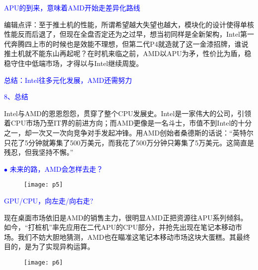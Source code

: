 \documentclass[utf8]{book}
\begin{document}
	
	\begin{flushleft}
		{\large \textcolor{blue}{APU的到来，意味着AMD开始走差异化路线\\}}
	\end{flushleft}

	编辑点评：至于推土机的性能，所谓希望越大失望也越大，模块化的设计使得单核性能反而后退了，但现在全盘否定还为之过早，想当初同样是全新架构，Intel第一代奔腾四上市的时候也是效能不理想，但第二代P4就造就了这一金漆招牌，谁说推土机就不能东山再起呢？在时机来临之前，AMD以APU为矛，性价比为盾，稳稳守住中低端市场，才得以与Intel继续周旋。
	
	\begin{flushleft}
		{\Large \textcolor{blue}{总结：Intel往多元化发展，AMD还需努力}}
	\end{flushleft}
	
	\begin{flushleft}
		{\LARGE \textcolor{blue}{8、总结\\}}
	\end{flushleft}

	Intel与AMD的恩恩怨怨，贯穿了整个CPU发展史。Intel是一家伟大的公司，引领着CPU市场乃至IT界的前进方向；而AMD更像是一名斗士，市值不到Intel的十分之一，却一次又一次向竞争对手发起冲锋。用AMD创始者桑德斯的话说：“英特尔只花了5分钟就筹集了500万美元，而我花了500万分钟只筹集了5万美元。这简直是残忍，但我坚持不懈。”
	
	\begin{flushleft}
		{\large \textcolor{blue}{$\bullet$ 未来的路，AMD会怎样去走？}}
	\end{flushleft}

	\begin{figure}[H]
		\centering
		\texttt{[image: p5]}
		\captionsetup{font={small}}
	\end{figure}

	\begin{flushleft}
		{\large \textcolor{blue}{GPU/CPU，向左走/向右走?}}
	\end{flushleft}

	现在桌面市场依旧是AMD的销售主力，很明显AMD正把资源往APU系列倾斜。如今，“打桩机”率先应用在二代APU的CPU部分，并抢先出现在笔记本移动市场。我们不妨大胆地猜测，AMD也在瞄准这笔记本移动市场这块大蛋糕。其最终目的，是为了实现异构运算。
	

		\begin{figure}[H]
		\centering
		\texttt{[image: p6]}
		\end{figure}
	
\end{document}
